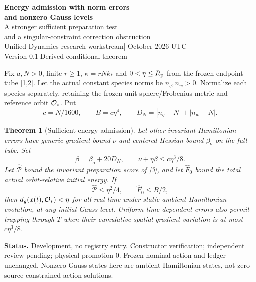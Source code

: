 \documentclass[11pt,a4paper]{article}
\newtheorem{theorem}{Theorem}\newtheorem{lemma}[theorem]{Lemma}\newtheorem{corollary}[theorem]{Corollary}
\begin{document}
\begin{center}
{\Large\bfseries Energy admission with norm errors\\and nonzero Gauss levels}\\[9pt]
{\large A stronger sufficient preparation test\\and a singular-constraint correction obstruction}\\[9pt]
Unified Dynamics research workstream\quad | October 2026 UTC\\
Version 0.1\quad |\quad Derived conditional theorem
\end{center}
\begin{abstract}
We extend the frozen endpoint preparation contract in two directions. Conserved errors in the two species norms give a centered Hamiltonian perturbation with an explicit curvature budget. A joint geometry-and-energy gate replaces the earlier small distance-only ball by a sufficient sublevel test inside the larger tube; an exact zero-Gauss example is admitted at 2.5 times the earlier sufficient initial radius. The proof works on the ambient normalized phase space and requires no zero-Gauss projection. Nonzero Gauss levels remain distinct from solutions of the zero-source constrained action. We quantify their conserved residual and retain the global trace obstruction to unequal-norm neutrality. An exact residual-cone example shows that correction distance can scale as the square root of the residual, precluding a linear correction estimate in that cone. No physical constraint repair or experimental result is asserted.
\end{abstract}
Fix $a,N>0$, finite $r\ge1$, $\kappa=rNk_*$ and $0<\eta\le R_{\rm p}$ from the frozen endpoint tube [1,2]. Let the actual constant species norms be $n_q,n_w>0$. Normalize each species separately, retaining the frozen unit-sphere/Frobenius metric and reference orbit $\mathcal O_*$. Put
\[
c=N/1600,\qquad B=c\eta^4,\qquad D_N=|n_q-N|+|n_w-N|.
\]
\begin{theorem}[Sufficient energy admission]\label{th:main}
Let other invariant Hamiltonian errors have generic gradient bound $\nu$ and centered Hessian bound $\beta_o$ on the full tube. Set
\[
\beta=\beta_o+20D_N,\qquad \nu+\eta\beta\le c\eta^3/8.
\]
Let $\widehat{\mathcal P}$ bound the invariant preparation score of [3], and let $\widehat F_0$ bound the total actual orbit-relative initial energy. If
\[
\boxed{\widehat{\mathcal P}\le\eta^2/4,\qquad \widehat F_0\le B/2,}
\]
then $d_g(x(t),\mathcal O_*)<\eta$ for all real time under static ambient Hamiltonian evolution, at any initial Gauss level. Uniform time-dependent errors also permit trapping through $T$ when their cumulative spatial-gradient variation is at most $c\eta^3/8$.
\end{theorem}
\textbf{Status.} Development, no registry entry. Constructor verification; independent review pending; physical promotion $0$. Frozen nominal action and ledger unchanged. Nonzero Gauss states here are ambient Hamiltonian states, not zero-source constrained-action solutions.
\newpage
\end{document}
